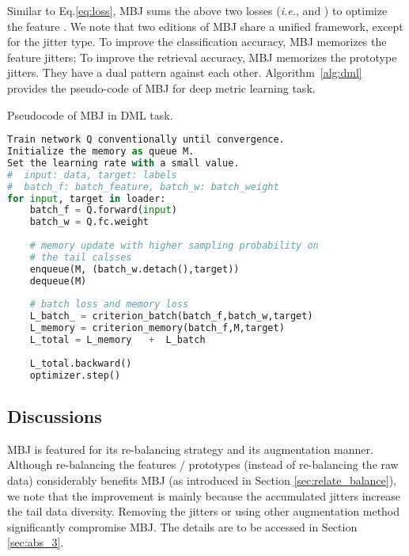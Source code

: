 \documentclass[final]{cvpr}
\def\ie{\textit{i.e.}}
\begin{document}
Similar to Eq.\ref{eq:loss}, MBJ sums the above two losses (\ie,  and ) to optimize the feature . We note that two editions of MBJ share a unified framework, except for the jitter type. 
To improve the classification accuracy, MBJ memorizes the feature jitters; To improve the retrieval accuracy, MBJ memorizes the prototype jitters. They have a dual pattern against each other. Algorithm~\ref{alg:dml} provides the pseudo-code of MBJ for deep metric learning task.
\begin{algorithm}[t]
\caption{Pseudocode of MBJ in DML task.}
\label{alg:dml}
\begin{lstlisting}[mathescape,language=python]  
Train network Q conventionally until convergence.
Initialize the memory as queue M.
Set the learning rate with a small value.
#  input: data, target: labels
#  batch_f: batch_feature, batch_w: batch_weight	
for input, target in loader:
    batch_f = Q.forward(input)
    batch_w = Q.fc.weight
    
    # memory update with higher sampling probability on
    # the tail calsses
    enqueue(M, (batch_w.detach(),target))
    dequeue(M)
    
    # batch loss and memory loss
    L_batch_ = criterion_batch(batch_f,batch_w,target)
    L_memory = criterion_memory(batch_f,M,target)
    L_total = L_memory   +  L_batch
    
    L_total.backward()
    optimizer.step()
\end{lstlisting}
\end{algorithm}



\subsection{Discussions}\label{sec:discussion}
MBJ is featured for its re-balancing strategy and its augmentation manner. Although re-balancing the features / prototypes (instead of re-balancing the raw data) considerably benefits MBJ (as introduced in Section \ref{sec:relate_balance}), we note that the improvement is mainly because the accumulated jitters increase the tail data diversity. Removing the jitters or using other augmentation method significantly compromise MBJ. The details are to be accessed in Section \ref{sec:abs_3}.
\end{document}
